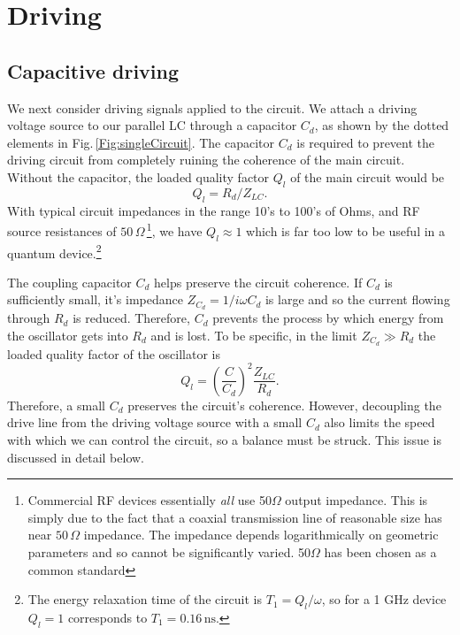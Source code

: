 \section{Driving} \label{sec:driving}

\subsection{Capacitive driving}

We next consider driving signals applied to the circuit.
We attach a driving voltage source to our parallel LC through a capacitor $C_d$, as shown by the dotted elements in Fig.\,\ref{Fig:singleCircuit}.
The capacitor $C_d$ is required to prevent the driving circuit from completely ruining the coherence of the main circuit.
Without the capacitor, the loaded quality factor $Q_l$ of the main circuit would be 
\begin{equation}
Q_l = R_d / Z_{LC} .
\end{equation}
With typical circuit impedances in the range 10's to 100's of Ohms, and RF source resistances of $50\,\Omega$\,\footnote{Commercial RF devices essentially \emph{all} use 50$\Omega$ output impedance. This is simply due to the fact that a coaxial transmission line of reasonable size has near $50 \, \Omega$ impedance. The impedance depends logarithmically on geometric parameters and so cannot be significantly varied. 50$\Omega$ has been chosen as a common standard}, we have $Q_l \approx 1$ which is far too low to be useful in a quantum device.\footnote{The energy relaxation time of the circuit is $T_1 = Q_l / \omega$, so for a 1 GHz device $Q_l=1$ corresponds to $T_1=0.16 \, \text{ns}$.}

The coupling capacitor $C_d$ helps preserve the circuit coherence.
If $C_d$ is sufficiently small, it's impedance $Z_{C_d} = 1/i\omega C_d$ is large and so the current flowing through $R_d$ is reduced.
Therefore, $C_d$ prevents the process by which energy from the oscillator gets into $R_d$ and is lost.
To be specific, in the limit $Z_{C_d} \gg R_d$ the loaded quality factor of the oscillator is 
\begin{equation}
Q_l = \left( \frac{C}{C_d} \right)^2 \frac{Z_{LC}}{R_d} .
\end{equation}
Therefore, a small $C_d$ preserves the circuit's coherence.
However, decoupling the drive line from the driving voltage source with a small $C_d$ also limits the speed with which we can control the circuit, so a balance must be struck.
This issue is discussed in detail below.

